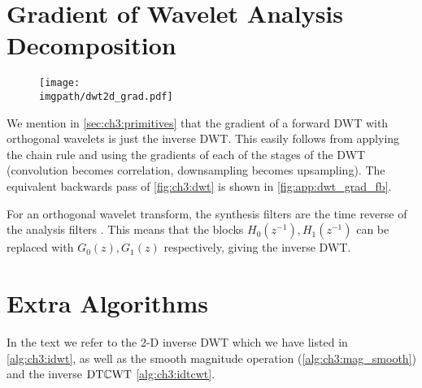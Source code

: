 \section{Gradient of Wavelet Analysis Decomposition}\label{sec:app:analysis_gradient}
\begin{figure}
  \centering
  \texttt{[image: \\imgpath/dwt2d\_grad.pdf]}
  \label{fig:app:dwt_grad_fb}
\end{figure}
We mention in \autoref{sec:ch3:primitives} that the gradient of a forward DWT with
orthogonal wavelets is just the inverse DWT. 
This easily follows from applying the chain rule and using the gradients of each of the
stages of the DWT (convolution becomes correlation, downsampling becomes
upsampling). The equivalent backwards pass of \autoref{fig:ch3:dwt} is
shown in \autoref{fig:app:dwt_grad_fb}.

For an orthogonal wavelet transform, the synthesis filters are the time reverse of
the analysis filters \cite[Chapter 3]{vetterli_wavelets_2007}. This means that
the blocks $H_0(z^{-1}), H_1(z^{-1})$ can be replaced with $G_0(z), G_1(z)$
respectively, giving the inverse DWT.

\section{Extra Algorithms}
In the text we refer to the 2-D inverse DWT which we have listed in
\autoref{alg:ch3:idwt}, as well as the smooth magnitude operation
(\autoref{alg:ch3:mag_smooth}) and the inverse $\mathrm{DT}\mathbb{C}\mathrm{WT}$ \autoref{alg:ch3:idtcwt}.

